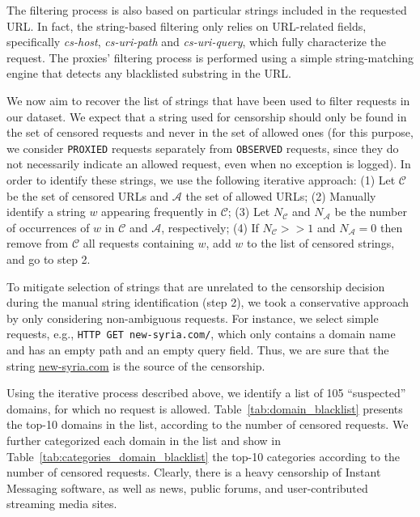 \documentclass{sig-alternate-2013}
\newcommand{\descr}[1]{\smallskip\noindent{\bf #1}}
\begin{document}
\descr{String-based Filtering.} The filtering process is also based on particular strings included in the requested URL. 
In fact, the string-based filtering only relies on URL-related fields, specifically \emph{cs-host}, \emph{cs-uri-path} and  \emph{cs-uri-query}, which fully characterize the request. The proxies' filtering process is performed using a simple string-matching engine that detects any blacklisted substring in the URL.  



We now aim to recover the list of strings that have been used to filter requests in our dataset. We expect that a string used for censorship should only be found in the set of censored requests and never in the set of allowed ones (for this purpose, we consider \texttt{PROXIED} requests separately from \texttt{OBSERVED} requests, since they do not necessarily indicate an allowed request, even when no exception is logged). 
In order to identify these strings, we use the following iterative approach: (1) Let $\mathcal{C}$ be the set of censored URLs and $\mathcal{A}$ the set of allowed URLs; (2) Manually identify a string $w$ appearing frequently in $\mathcal{C}$; (3) Let $N_\mathcal{C}$ and $N_\mathcal{A}$ be the number of occurrences of $w$ in $\mathcal{C}$ and $\mathcal{A}$, respectively; (4) If $N_\mathcal{C} >> 1$ and  $N_\mathcal{A} = 0$ then remove from $\mathcal{C}$ all requests containing $w$, add $w$ to the list of censored strings, and go to step 2. 


To mitigate selection of strings that are unrelated to the censorship decision during the
manual string identification (step 2), we took a conservative approach by only considering non-ambiguous requests. For instance, we select simple requests, e.g., \texttt{HTTP GET new-syria.com/}, which only contains a domain name and has an empty path and an empty query field. Thus, we are sure that the string \url{new-syria.com} is the source of the censorship. 




\descr{URL-based Filtering.}
Using the iterative process described above, we identify a list of 105 ``suspected'' domains, for which no request is allowed.  Table~\ref{tab:domain_blacklist} presents the top-10 domains in the list, according to the number of censored requests. We further categorized each domain in the list and show in Table~\ref{tab:categories_domain_blacklist} the top-10 categories according to the number of censored requests. Clearly, there is a heavy censorship of Instant Messaging software, as well as news, public forums, and user-contributed streaming media sites. 
\end{document}
